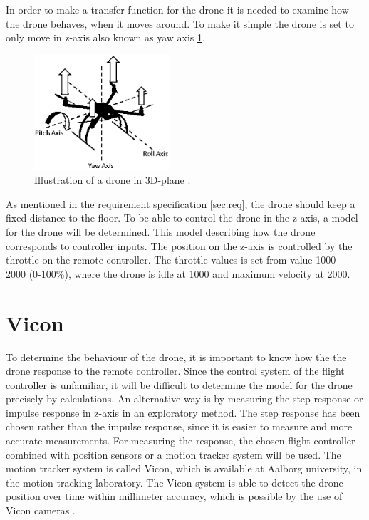 In order to make a transfer function for the drone it is needed to examine how the drone behaves, when it moves around. To make it simple the drone is set to only move in z-axis also known as yaw axis \ref{fig:z_axis}.
\begin{figure}[H]
    \centering
    \includegraphics[width=0.45\textwidth]{figures/ch_movement/z-axis.png}
    \caption{Illustration of a drone in 3D-plane \cite{drone_axis}.}
    \label{fig:z_axis}
\end{figure}

 As mentioned in the requirement specification \ref{sec:req}, the drone should keep a fixed distance to the floor. To be able to control the drone in the z-axis, a model for the drone will be determined. This model describing how the drone corresponds to controller inputs. The position on the z-axis is controlled by the throttle on the remote controller. The throttle values is set from value 1000 - 2000 (0-100\%), where the drone is idle at 1000 and maximum velocity at 2000.  

\section{Vicon}\label{s:vicon}
To determine the behaviour of the drone, it is important to know how the the drone response to the remote controller. 
Since the control system of the flight controller is unfamiliar, it will be difficult to determine the model for the drone precisely by calculations. An alternative way is by measuring the step response or impulse response in z-axis in an exploratory method. The step response has been chosen rather than the impulse response, since it is easier to measure and more accurate measurements. For measuring the response, the chosen flight controller combined with position sensors or a motion tracker system will be used. The motion tracker system is called Vicon, which is available at Aalborg university, in the motion tracking laboratory. The Vicon system is able to detect the drone position over time within millimeter accuracy, which is possible by the use of Vicon cameras \cite{Vicon}.

